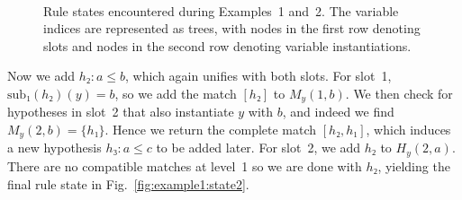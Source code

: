 \documentclass[runningheads]{llncs}
\newcommand{\sub}{\ensuremath{\mathrm{sub}}}
\begin{document}
\begin{figure}
\begin{subcaptiongroup}
\begin{minipage}{\textwidth}
    \end{minipage}
  \end{subcaptiongroup}
  \\[1em]
  \begin{subcaptiongroup}
    \subcaptionlistentry{}
    \begin{minipage}{\textwidth}
    \end{minipage}
  \end{subcaptiongroup}
  \caption{%
    Rule states encountered during Examples~1 and~2.
    The variable indices are represented as trees, with nodes in the first row denoting slots and nodes in the second row denoting variable instantiations.%
  }
\end{figure}

Now we add $h₂ : a ≤ b$, which again unifies with both slots.
For slot~1, $\sub₁(h₂)(y) = b$, so we add the match $[h₂]$ to $M_{y}(1, b)$.
We then check for hypotheses in slot~2 that also instantiate $y$ with $b$, and indeed we find $M_{y}(2, b) = \{h₁\}$.
Hence we return the complete match $[h₂, h₁]$, which induces a new hypothesis $h₃ : a ≤ c$ to be added later.
For slot~2, we add $h₂$ to $H_{y}(2, a)$.
There are no compatible matches at level~1 so we are done with $h₂$, yielding the final rule state in Fig.~\ref{fig:example1:state2}.
\end{document}
